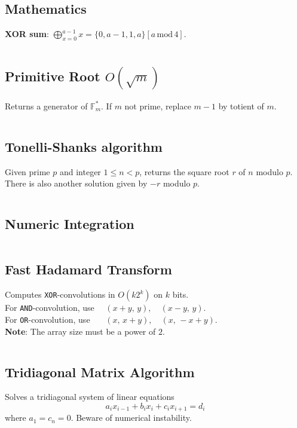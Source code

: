 \documentclass[8pt,a4paper,landscape,oneside]{amsart}
\newcommand{\mintedstyle}[2]{\inputminted[fontsize=\normalsize,baselinestretch=.9,breaklines,tabsize=2]{#1}{code/#2}}
\newcommand{\code}[1]{\mintedstyle{cpp}{#1}}
\newif\ifverbose
\begin{document}
\begin{multicols*}{3}
\section{Mathematics}

\textbf{XOR sum}: $\bigoplus_{x=0}^{a - 1} x = \{0, a - 1, 1, a\}[a \, \mathrm{mod} \, 4]$.

\code{math/math.cpp}

\subsection{Primitive Root $O(\sqrt{m})$}
Returns a generator of $\mathbb{F}_m^*$. If $m$ not prime, replace $m-1$ by totient of $m$.
\code{math/primitive_root.cpp}

\subsection{Tonelli-Shanks algorithm}
Given prime $p$ and integer $1\leq n<p$, returns the square root $r$ of
$n$ modulo $p$. There is also another solution given by $-r$ modulo
$p$.
\code{math/tonelli_shanks.cpp}

\subsection{Numeric Integration}
\ifverbose
Numeric integration using Simpson's rule.
\fi
\code{math/numeric_integration.cpp}

\subsection{Fast Hadamard Transform}
Computes \texttt{XOR}-convolutions in $O(k 2^k)$ on $k$ bits. \\
For \texttt{AND}-convolution, use $\quad  (x + y, \, y), \quad (x-y, \, y)$. \\
For \texttt{OR}-convolution, use $\quad\,\,\, (x, \, x + y), \quad (x, \, -x + y)$. \\
\textbf{Note}: The array size must be a power of $2$.
\code{math/fht.cpp}

\subsection{Tridiagonal Matrix Algorithm}

Solves a tridiagonal system of linear equations \[ a_i x_{i-1} + b_i x_i + c_i x_{i+1} = d_i \] where $a_1 = c_n = 0$.
Beware of numerical instability.
\code{math/tridiagonal.cpp}


\end{multicols*}
\end{document}
